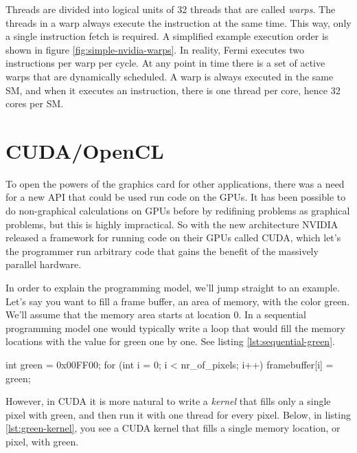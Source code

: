 \documentclass[../main/report.tex]{subfiles}
\begin{document}
Threads are divided into logical units of 32 threads that are called \emph{warps}. 
The threads in a warp always execute the instruction at the same time.
This way, only a single instruction fetch is required.
A simplified example execution order is shown in figure \ref{fig:simple-nvidia-warps}.
In reality, Fermi executes two instructions per warp per cycle. 
At any point in time there is a set of active warps that are dynamically scheduled. 
A warp is always executed in the same SM, and when it executes an instruction, there is one thread per core, hence 32 cores per SM.




\section{CUDA/OpenCL}

To open the powers of the graphics card for other applications, there was a need for a new API that could be
used run code on the GPUs. It has been possible to do non-graphical calculations on GPUs before by 
redifining problems as graphical problems, but this is highly impractical. 
So with the new architecture NVIDIA released a framework for running code on their GPUs called CUDA, 
which let's the programmer run arbitrary code that gains the benefit of the massively parallel hardware.

In order to explain the programming model, we'll jump straight to an example.
Let's say you want to fill a frame buffer, an area of memory, with the color green.
We'll assume that the memory area starts at location 0.
In a sequential programming model one would typically write a loop that would fill
the memory locations with the value for green one by one.
See listing \ref{lst:sequential-green}.

\begin{c-code}[caption=A sequential program filling the screen with green, label=lst:sequential-green]
int green = 0x00FF00;
for (int i = 0; i < nr_of_pixels; i++){
	framebuffer[i] = green;
}
\end{c-code}

However, in CUDA it is more natural to write a \emph{kernel} that fills only a single pixel with green, 
and then run it with one thread for every pixel.
Below, in listing \ref{lst:green-kernel},
you see a CUDA kernel that fills a single memory location, or pixel, with green.
\end{document}
